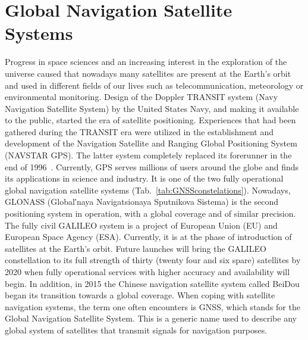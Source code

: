 \chapter{Global Navigation Satellite Systems}
Progress in space sciences and an increasing interest in the exploration of the universe caused that nowadays many satellites
are present at the Earth's orbit and used in different fields of our
lives such as telecommunication, meteorology or environmental monitoring. Design of the Doppler TRANSIT system (Navy 
Navigation Satellite System) by the United States Navy, and making it available to the public, started the era of satellite 
positioning.
Experiences that had been gathered during the TRANSIT era were utilized in the establishment and development of 
the Navigation Satellite and Ranging Global Positioning System (NAVSTAR GPS). The latter system completely replaced its forerunner 
in the end of 1996~\citep{Teunissen:2017}. Currently, GPS serves millions of users around the globe and finds its applications in 
science and industry. It is one of the two fully operational global navigation satellite systems (Tab.~\ref{tab:GNSSconstelations}). 
Nowadays, GLONASS (Global′naya Navigatsionaya Sputnikova Sistema) is the second positioning system in operation, with a global coverage 
and of similar precision. The fully civil GALILEO system is a project of European Union (EU) and European Space Agency (ESA). Currently, it 
is at the phase of introduction of satellites at the Earth's orbit. Future launches will bring the GALILEO constellation to its full strength of 
thirty (twenty four and six spare) satellites by 2020 when fully operational services with higher accuracy and availability will begin. 
In addition, in 2015 the Chinese navigation satellite system called BeiDou began its transition towards a global coverage.
When coping with satellite navigation systems, the term one often encounters is GNSS, which stands for the Global Navigation Satellite System. 
This is a generic name used to describe any global system of satellites that transmit signals for navigation purposes. \par{}

